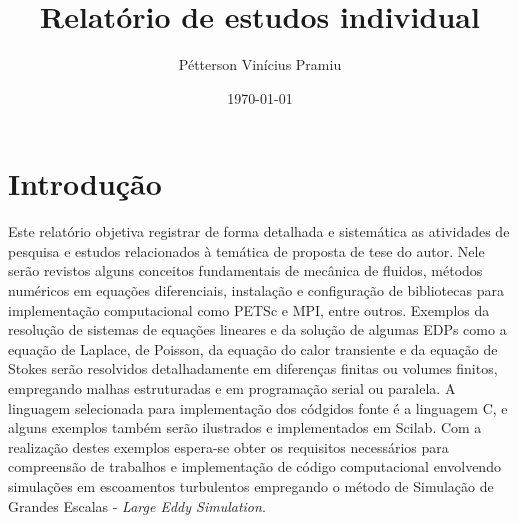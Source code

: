 \documentclass[final,3p,12pt,times,onecolumn,authoryear]{report}
\begin{document}
\title{Relatório de estudos individual}
\author{Pétterson Vinícius Pramiu}
\date{\today}

\maketitle

\tableofcontents

\chapter{Introdução}
Este relatório objetiva registrar de forma detalhada e sistemática as atividades de pesquisa e estudos relacionados à temática de proposta de tese do autor. Nele serão revistos alguns conceitos fundamentais de mecânica de fluidos, métodos numéricos em equações diferenciais, instalação e configuração de bibliotecas para implementação computacional como PETSc e MPI, entre outros. Exemplos da resolução de sistemas de equações lineares e da solução de algumas EDPs como a equação de Laplace, de Poisson, da equação do calor transiente e da equação de Stokes serão resolvidos detalhadamente em diferenças finitas ou volumes finitos, empregando malhas estruturadas e em programação serial ou paralela. A linguagem selecionada para implementação dos códgidos fonte é a linguagem C, e alguns exemplos também serão ilustrados e implementados em Scilab. Com a realização destes exemplos espera-se obter os requisitos necessários para compreensão de trabalhos e implementação de código computacional envolvendo simulações em escoamentos turbulentos empregando o método de Simulação de Grandes Escalas - \textit{Large Eddy Simulation}.


%





% 


\nocite{*}



\end{document}

